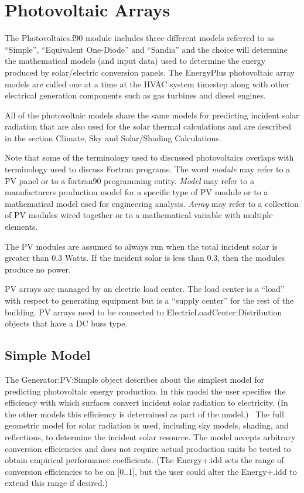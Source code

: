 \section{Photovoltaic Arrays}\label{photovoltaic-arrays}

The Photovoltaics.f90 module includes three different models referred to as ``Simple'', ``Equivalent One-Diode'' and ``Sandia'' and the choice will determine the mathematical models (and input data) used to determine the energy produced by solar/electric conversion panels. The EnergyPlus photovoltaic array models are called one at a time at the HVAC system timestep along with other electrical generation components such as gas turbines and diesel engines.

All of the photovoltaic models share the same models for predicting incident solar radiation that are also used for the solar thermal calculations and are described in the section Climate, Sky and Solar/Shading Calculations.

Note that some of the terminology used to discussed photovoltaics overlaps with terminology used to discuss Fortran programs. The word \emph{module} may refer to a PV panel or to a fortran90 programming entity. \emph{Model} may refer to a manufacturers production model for a specific type of PV module or to a mathematical model used for engineering analysis. \emph{Array} may refer to a collection of PV modules wired together or to a mathematical variable with multiple elements.

The PV modules are assumed to always run when the total incident solar is greater than 0.3 Watts. If the incident solar is less than 0.3, then the modules produce no power.

PV arrays are managed by an electric load center. The load center is a ``load'' with respect to generating equipment but is a ``supply center'' for the rest of the building. PV arrays need to be connected to ElectricLoadCenter:Distribution objects that have a DC buss type.

\subsection{Simple Model}\label{simple-model}

The Generator:PV:Simple object describes about the simplest model for predicting photovoltaic energy production. In this model the user specifies the efficiency with which surfaces convert incident solar radiation to electricity. (In the other models this efficiency is determined as part of the model.)~ The full geometric model for solar radiation is used, including sky models, shading, and reflections, to determine the incident solar resource. The model accepts arbitrary conversion efficiencies and does not require actual production units be tested to obtain empirical performance coefficients. (The Energy+.idd sets the range of conversion efficiencies to be on {[}0..1{]}, but the user could alter the Energy+.idd to extend this range if desired.)

